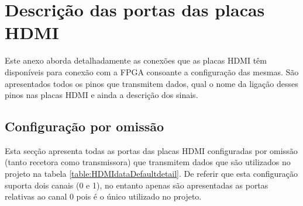\chapter{Descrição das portas das placas HDMI} \label{ap1:HDMI}

Este anexo aborda detalhadamente as conexões que as placas HDMI têm disponíveis para conexão com a FPGA consoante a configuração das mesmas. São apresentados todos os pinos que transmitem dados, qual o nome da ligação desses pinos nas placas HDMI e ainda a descrição dos sinais.
\section{Configuração por omissão} \label{ap1:default}

Esta secção apresenta todas as portas das placas HDMI configuradas por omissão (tanto recetora como transmissora) que transmitem dados que são utilizados no projeto na tabela \ref{table:HDMIdataDefaultdetail}. De referir que esta configuração suporta dois canais (0 e 1), no entanto apenas são apresentadas as portas relativas ao canal 0 pois é o único utilizado no projeto.

